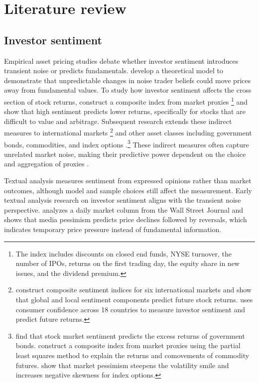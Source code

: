 \section{Literature review}\label{sec:literature_review}

\subsection{Investor sentiment}


Empirical asset pricing studies debate whether investor sentiment introduces transient noise or predicts fundamentals. \citet{delong1990noise} develop a theoretical model to demonstrate that unpredictable changes in noise trader beliefs could move prices away from fundamental values. To study how investor sentiment affects the cross section of stock returns, \citet{baker2006} construct a composite index from market proxies \footnote{The index includes discounts on closed end funds, NYSE turnover, the number of IPOs, returns on the first trading day, the equity share in new issues, and the dividend premium.} and show that high sentiment predicts lower returns, specifically for stocks that are difficult to value and arbitrage. Subsequent research extends these indirect measures to international markets \citep{baker2012global,schmeling2009} \footnote{\citet{baker2012global} construct composite sentiment indices for six international markets and show that global and local sentiment components predict future stock returns. \citet{schmeling2009} uses consumer confidence across 18 countries to measure investor sentiment and predict future returns.} and other asset classes including government bonds, commodities, and index options \citep{baker2012bonds,gao2015,han2008}.\footnote{\citet{baker2012bonds} find that stock market sentiment predicts the excess returns of government bonds. \citet{gao2015} construct a composite index from market proxies using the partial least squares method to explain the returns and comovements of commodity futures. \citet{han2008} show that market pessimism steepens the volatility smile and increases negative skewness for index options.} These indirect measures often capture unrelated market noise, making their predictive power dependent on the choice and aggregation of proxies \citep{huang2015}.

Textual analysis measures sentiment from expressed opinions rather than market outcomes, although model and sample choices still affect the measurement. Early textual analysis research on investor sentiment aligns with the transient noise perspective. \citet{tetlock2007giving} analyzes a daily market column from the Wall Street Journal and shows that media pessimism predicts price declines followed by reversals, which indicates temporary price pressure instead of fundamental information.


